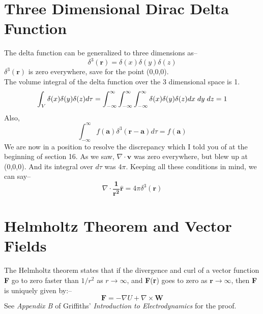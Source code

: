 \documentclass[12pt]{article}
\begin{document}
\section{Three Dimensional Dirac Delta Function}
The delta function can be generalized to three dimensions as--
\begin{equation}
    \delta^3(\mathbf{r}) =\delta(x)\delta(y)\delta(z)
\end{equation}
$\delta^3(\mathbf{r})$ is zero everywhere, save for the point (0,0,0).\\
The volume integral of the delta function over the 3 dimensional space is 1.
\begin{equation}
    \int_{V}\delta(x)\delta(y)\delta(z)d\tau=\int_{-\infty}^{\infty}\int_{-\infty}^{\infty}\int_{-\infty}^{\infty}\delta(x)\delta(y)\delta(z)dx\hspace{0.1cm}dy\hspace{0.1cm}dz=1
\end{equation} 
Also,
\begin{equation}
    \int_{-\infty}^{\infty}f(\mathbf{a})\delta^3(\mathbf{r}-\mathbf{a})d\tau=f(\mathbf{a})
\end{equation}
We are now in a position to resolve the discrepancy which I told you of at the beginning of section 16. 
As we saw, $\nabla\cdot\mathbf{v}$ was zero everywhere, but blew up at (0,0,0). And its integral over $d\tau$ was $4\pi$. Keeping all these conditions in mind, we can say--
\begin{equation}
    \nabla\cdot\mathbf{\frac{1}{r^2}\hat{r}}=4\pi\delta^3(\mathbf{r})
\end{equation}

\section{Helmholtz Theorem and Vector Fields}
The Helmholtz theorem states that if the divergence and curl of a vector function \textbf{F} go to zero faster than $1/r^2$ as $r\rightarrow \infty$, and \textbf{F}(\textbf{r}) goes to zero as $\mathbf{r}\rightarrow \infty$, then \textbf{F} is uniquely given by:--
\begin{equation}
    \mathbf{F}=-\nabla U + \nabla\times\mathbf{W}
\end{equation}
See \textit{Appendix B} of Griffiths' \textit{Introduction to Electrodynamics} for the proof.
\end{document}

